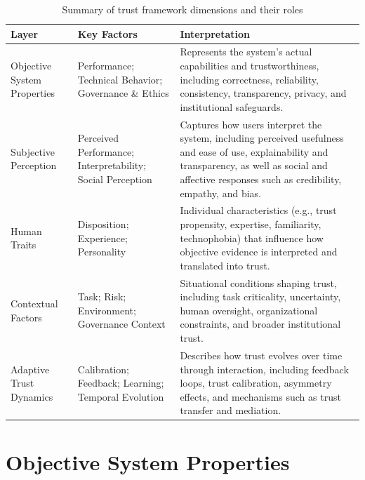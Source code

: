 \documentclass[sigconf]{acmart}
\begin{document}
\begin{table}[t]
\centering
\begin{tabular}{p{} p{} p{}}
\toprule
\textbf{Layer} & \textbf{Key Factors} & \textbf{Interpretation} \\
\midrule

Objective System Properties
& Performance; Technical Behavior; Governance \& Ethics 
& Represents the system’s actual capabilities and trustworthiness, including correctness, reliability, consistency, transparency, privacy, and institutional safeguards. \\

\midrule

Subjective Perception 
& Perceived Performance; Interpretability; Social Perception 
& Captures how users interpret the system, including perceived usefulness and ease of use, explainability and transparency, as well as social and affective responses such as credibility, empathy, and bias. \\

\midrule

Human Traits 
& Disposition; Experience; Personality 
& Individual characteristics (e.g., trust propensity, expertise, familiarity, technophobia) that influence how objective evidence is interpreted and translated into trust. \\

\midrule

Contextual Factors 
& Task; Risk; Environment; Governance Context 
& Situational conditions shaping trust, including task criticality, uncertainty, human oversight, organizational constraints, and broader institutional trust. \\

\midrule

Adaptive Trust Dynamics 
& Calibration; Feedback; Learning; Temporal Evolution 
& Describes how trust evolves over time through interaction, including feedback loops, trust calibration, asymmetry effects, and mechanisms such as trust transfer and mediation. \\

\bottomrule
\end{tabular}
\caption{Summary of trust framework dimensions and their roles}
\label{tab:trust_framework_summary}
\end{table}

\section{Objective System Properties}
\end{document}
